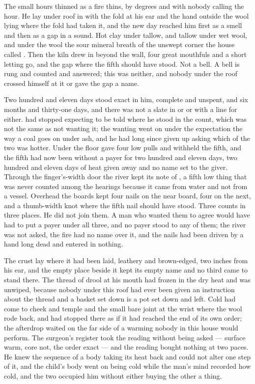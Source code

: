 
The small hours thinned as a fire thins, by degrees and with nobody calling the hour. He lay under  roof in  with the fold at his ear and the hand outside the wool lying where the fold had taken it, and the new day reached him first as a smell and then as a gap in a sound. Hot clay under tallow, and tallow under wet wool, and under the wool the sour mineral breath of the unswept corner the house called . Then the kiln drew in beyond the wall, four great mouthfuls and a short letting go, and the gap where the fifth should have stood. Not a bell. A bell is rung and counted and answered; this was neither, and nobody under the roof crossed himself at it or gave the gap a name.

Two hundred and eleven days stood exact in him, complete and unspent, and six months and thirty-one days, and there was not a slate in  or  or  with a line for either.  had stopped expecting to be told where he stood in the count, which was not the same as not wanting it; the wanting went on under the expectation the way a coal goes on under ash, and he had long since given up asking which of the two was hotter. Under the floor  gave four low pulls and withheld the fifth, and the fifth had now been without a payer for two hundred and eleven days, two hundred and eleven days of heat given away and no name set to the giver. Through the finger's-width door the river kept its note of , a fifth low thing that was never counted among the hearings because it came from water and not from a vessel. Overhead the boards kept four nails on the near board, four on the next, and a thumb-width knot where the fifth nail should have stood. Three counts in three places. He did not join them. A man who wanted them to agree would have had to put a payer under all three, and no payer stood to any of them; the river was not asked, the fire had no name over it, and the nails had been driven by a hand long dead and entered in nothing.

The crust lay where it had been laid, leathery and brown-edged, two inches from his ear, and the empty place beside it kept its empty name and no third came to stand there. The thread of drool at his mouth had frozen in the dry heat and was unwiped, because nobody under this roof had ever been given an instruction about the thread and a basket set down is a pot set down and left. Cold had come to cheek and temple and the small bare joint at the wrist where the wool rode back, and had stopped there as if it had reached the end of its own order; the afterdrop waited on the far side of a warming nobody in this house would perform. The surgeon's register took the reading without being asked --- surface warm, core not, the order exact --- and the reading bought nothing at two paces. He knew the sequence of a body taking its heat back and could not alter one step of it, and the child's body went on being cold while the man's mind recorded how cold, and the two occupied him without either buying the other a thing.

